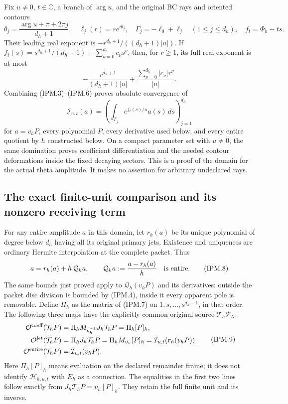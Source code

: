 \documentclass[11pt,a4paper]{article}
\theoremstyle{definition}
\begin{document}
Fix \(u\ne0\), \(t\in\mathbb C\), a branch of \(\arg u\), and
the original BC rays and oriented contours
\[
 \theta_j=\frac{\arg u+\pi+2\pi j}{d_h+1},\quad
 \ell_j(r)=re^{i\theta_j},\quad
 \Gamma_j=-\ell_0+\ell_j\quad(1\le j\le d_h),\quad
 f_t=\Phi_h-ts.
 \tag{IPM.5}
\]
Their leading real exponent is
\(-r^{d_h+1}/((d_h+1)|u|)\). If
\(f_t(s)=s^{d_h+1}/(d_h+1)+\sum_{\nu=0}^{d_h}c_\nu s^\nu\),
then, for \(r\ge1\), its full real exponent is at most
\[
 -\frac{r^{d_h+1}}{(d_h+1)|u|}
       +\frac{\sum_{\nu=0}^{d_h}|c_\nu|r^\nu}{|u|}.
 \tag{IPM.6}
\]
Combining (IPM.3)--(IPM.6) proves absolute convergence of
\[
 \mathcal I_{u,t}(a)=
  \left(\int_{\Gamma_j}e^{f_t(s)/u}a(s)\,ds\right)_{j=1}^{d_h}
 \tag{IPM.7}
\]
for \(a=v_hP\), every polynomial \(P\), every derivative used below,
and every entire quotient by \(h\) constructed below. On a compact
parameter set with \(u\ne0\), the same domination proves coefficient
differentiation and the needed contour deformations inside the fixed
decaying sectors. This is a proof of the domain for the actual theta
amplitude. It makes no assertion for arbitrary undeclared rays.

\subsection{The exact finite-unit comparison and its nonzero receiving term}

For any entire amplitude \(a\) in this domain, let
\(r_h(a)\) be its unique polynomial of degree below \(d_h\) having
all its original primary jets. Existence and uniqueness are ordinary
Hermite interpolation at the complete packet. Thus
\[
 a=r_h(a)+h\,\mathcal Q_ha,\qquad
 \mathcal Q_ha:=\frac{a-r_h(a)}h
 \quad\hbox{is entire}.
 \tag{IPM.8}
\]
The same bounds just proved apply to \(\mathcal Q_h(v_hP)\) and
its derivatives: outside the packet disc division is bounded by (IPM.4),
inside it every apparent pole is removable. Define
\(\Pi_h\) as the matrix of (IPM.7) on \(1,s,\ldots,s^{d_h-1}\),
in that order. The following three maps have the explicitly common
original source \(\mathcal T_h\mathcal P_N\):
\[
 \begin{aligned}
 \mathcal O^{\rm coeff}(\mathcal T_hP)
    &=\Pi_h M_{\upsilon_h^{-1}}J_h\mathcal T_hP
      =\Pi_h[P]_h,\\
 \mathcal O^{\rm jet}(\mathcal T_hP)
    &=\Pi_hJ_h\mathcal T_hP
      =\Pi_h M_{\upsilon_h}[P]_h
      =\mathcal I_{u,t}(r_h(v_hP)),\\
 \mathcal O^{\rm entire}(\mathcal T_hP)
    &=\mathcal I_{u,t}(v_hP).
 \end{aligned}
 \tag{IPM.9}
\]
Here \(\Pi_h[P]_h\) means evaluation on the declared remainder frame;
it does not identify \(\mathcal H_{h,u,t}\) with \(E_h\) as a
connection. The equalities in the first two lines follow exactly from
\(J_h\mathcal T_hP=\upsilon_h[P]_h\). They retain the full finite
unit and its inverse.
\end{document}
